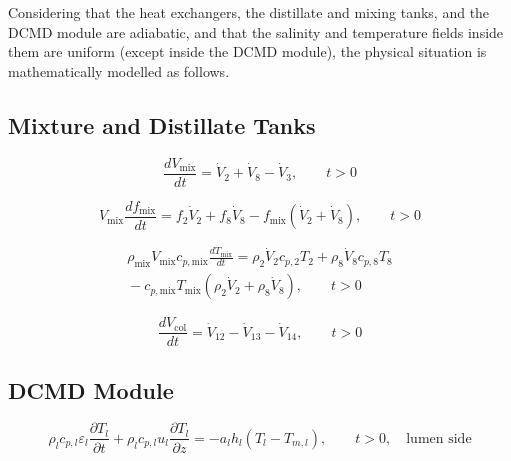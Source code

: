 \documentclass[14pt,letterpaper,fleqn]{extarticle}
\begin{document}
Considering that the heat exchangers, the distillate and mixing tanks, and the DCMD
module are adiabatic, and that the salinity and temperature fields inside them are
uniform (except inside the DCMD module), the physical situation is mathematically
modelled as follows.

\subsection*{Mixture and Distillate Tanks}

\begin{equation}
\frac{dV_{\mathrm{mix}}}{dt}
=
\dot{V}_{2}
+
\dot{V}_{8}
-
\dot{V}_{3},
\qquad
t>0
\label{eq:vmix}
\end{equation}

\begin{equation}
V_{\mathrm{mix}}
\frac{df_{\mathrm{mix}}}{dt}
=
f_{2}\dot{V}_{2}
+
f_{8}\dot{V}_{8}
-
f_{\mathrm{mix}}
\left(
\dot{V}_{2}
+
\dot{V}_{8}
\right),
\qquad
t>0
\label{eq:fmix}
\end{equation}

\begin{multline}
\rho_{\mathrm{mix}}
V_{\mathrm{mix}}
c_{p,\mathrm{mix}}
\frac{dT_{\mathrm{mix}}}{dt}
=
\rho_{2}\dot{V}_{2}c_{p,2}T_{2}
+
\rho_{8}\dot{V}_{8}c_{p,8}T_{8}
\\
{}-
c_{p,\mathrm{mix}}T_{\mathrm{mix}}
\left(
\rho_{2}\dot{V}_{2}
+
\rho_{8}\dot{V}_{8}
\right),
\qquad
t>0
\label{eq:tmix}
\end{multline}

\begin{equation}
\frac{dV_{\mathrm{col}}}{dt}
=
\dot{V}_{12}
-
\dot{V}_{13}
-
\dot{V}_{14},
\qquad
t>0
\label{eq:vcol}
\end{equation}

\subsection*{DCMD Module}

\begin{equation}
\rho_l c_{p,l}\varepsilon_l
\frac{\partial T_l}{\partial t}
+
\rho_l c_{p,l}u_l
\frac{\partial T_l}{\partial z}
=
-a_l h_l
\left(
T_l-T_{m,l}
\right),
\qquad
t>0,
\quad
\text{lumen side}
\label{eq:lumen-energy-balance}
\end{equation}
\end{document}
